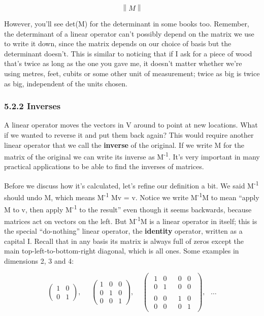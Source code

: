 \documentclass[oneside,english]{amsbook}
\numberwithin{section}{chapter}
\theoremstyle{plain}
\theoremstyle{definition}
\begin{document}
\[\left\| M \right\|\]

However, you'll see det(M) for the determinant in some books too.
Remember, the determinant of a linear operator can't possibly depend on
the matrix we use to write it down, since the matrix depends on our
choice of basis but the determinant doesn't. This is similar to noticing
that if I ask for a piece of wood that's twice as long as the one you
gave me, it doesn't matter whether we're using metres, feet, cubits or
some other unit of measurement; twice as big is twice as big,
independent of the units chosen.

\subsubsection{5.2.2 Inverses}\label{inverses}

A linear operator moves the vectors in V around to point at new
locations. What if we wanted to reverse it and put them back again? This
would require another linear operator that we call the \textbf{inverse}
of the original. If we write M for the matrix of the original we can
write its inverse as M\textsuperscript{-1}. It's very important in many
practical applications to be able to find the inverses of matrices.

Before we discuss how it's calculated, let's refine our definition a
bit. We said M\textsuperscript{-1} should undo M, which means
M\textsuperscript{-1} Mv = v. Notice we write M\textsuperscript{-1}M to
mean ``apply M to v, then apply M\textsuperscript{-1} to the result''
even though it seems backwards, because matrices act on vectors on the
left. But M\textsuperscript{-1}M is a linear operator in itself; this is
the special ``do-nothing'' linear operator, the \textbf{identity}
operator, written as a capital I. Recall that in any basis its matrix is
always full of zeros except the main top-left-to-bottom-right diagonal,
which is all ones. Some examples in dimensions 2, 3 and 4:

\[\begin{pmatrix}
	1 & 0 \\
	0 & 1
\end{pmatrix},\ \ \ \ \ \ \begin{pmatrix}
	1 & 0 & 0 \\
	0 & 1 & 0 \\
	0 & 0 & 1
\end{pmatrix},\ \ \ \ \ \begin{pmatrix}
	\begin{matrix}
		1 & 0 \\
		0 & 1
	\end{matrix} & \begin{matrix}
		0 & 0 \\
		0 & 0
	\end{matrix} \\
	\begin{matrix}
		0 & 0 \\
		0 & 0
	\end{matrix} & \begin{matrix}
		1 & 0 \\
		0 & 1
	\end{matrix}
\end{pmatrix},\ \ \ \ldots\]
\end{document}
